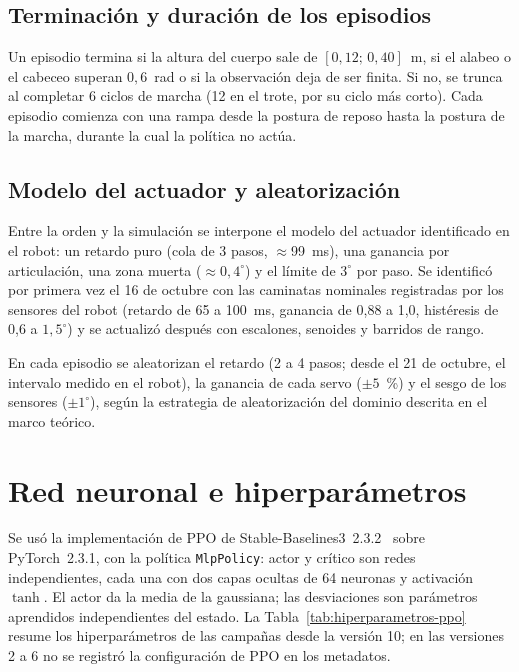 \subsection{Terminación y duración de los episodios}

Un episodio termina si la altura del cuerpo sale de $[0{,}12;\,0{,}40]$~m, si
el alabeo o el cabeceo superan $0{,}6$~rad o si la observación deja de ser
finita. Si no, se trunca al completar 6 ciclos de marcha (12 en el trote, por
su ciclo más corto). Cada episodio comienza con una rampa desde la postura de
reposo hasta la postura de la marcha, durante la cual la política no actúa.

\subsection{Modelo del actuador y aleatorización}

Entre la orden y la simulación se interpone el modelo del actuador
identificado en el robot: un retardo puro (cola de 3 pasos, $\approx$99~ms), una
ganancia por articulación, una zona muerta ($\approx0{,}4^\circ$) y el límite de
$3^\circ$ por paso. Se identificó por primera vez el 16 de octubre con las
caminatas nominales registradas por los sensores del robot (retardo de 65 a
100~ms, ganancia de 0,88 a 1,0, histéresis de 0,6 a $1{,}5^\circ$) y se
actualizó después con escalones, senoides y barridos de rango.

En cada episodio se aleatorizan el retardo (2 a 4 pasos; desde el 21 de
octubre, el intervalo medido en el robot), la ganancia de cada servo
($\pm5$~\%) y el sesgo de los sensores ($\pm1^\circ$), según la estrategia de
aleatorización del dominio descrita en el marco teórico.

\section{Red neuronal e hiperparámetros}

Se usó la implementación de PPO de Stable-Baselines3~2.3.2~\cite{raffin2021sb3}
sobre PyTorch~2.3.1, con la política \texttt{MlpPolicy}: actor y crítico son
redes independientes, cada una con dos capas ocultas de 64 neuronas y activación
$\tanh$. El actor da la media de la gaussiana; las desviaciones son parámetros
aprendidos independientes del estado. La Tabla~\ref{tab:hiperparametros-ppo}
resume los hiperparámetros de las campañas desde la versión 10; en las versiones
2 a 6 no se registró la configuración de PPO en los metadatos.

